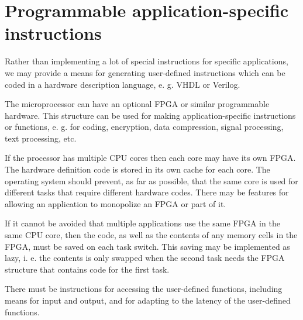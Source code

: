 \documentclass[forwardcom.tex]{subfiles}
\begin{document}
\RaggedRight

\chapter{Programmable application-specific instructions}
Rather than implementing a lot of special instructions for specific applications, we may provide a means for generating user-defined instructions which can be coded in a hardware description language, e. g. VHDL or Verilog. 
\vspace{2mm}

The microprocessor can have an optional FPGA or similar programmable hardware. This structure can be used for making application-specific instructions or functions, e. g. for coding, encryption, data compression, signal processing, text processing, etc. 
\vspace{2mm}

If the processor has multiple CPU cores then each core may have its own FPGA. The hardware definition code is stored in its own cache for each core. The operating system should prevent, as far as possible, that the same core is used for different tasks that require different hardware codes. There may be features for allowing an application to monopolize an FPGA or part of it. 
\vspace{2mm}

If it cannot be avoided that multiple applications use the same FPGA in the same CPU core, then the code, as well as the contents of any memory cells in the FPGA, must be saved on each task switch. This saving may be implemented as lazy, i. e. the contents is only swapped when the second task needs the FPGA structure that contains code for the first task. 
\vspace{2mm}

There must be instructions for accessing the user-defined functions, including means for input and output, and for adapting to the latency of the user-defined functions.
\end{document}
